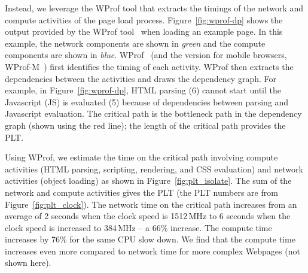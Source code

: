 
 
Instead, we leverage the WProf tool that extracts the timings of the network and compute activities of the page load process. Figure~\ref{fig:wprof-dp} shows the output provided by the WProf tool~\cite{wang2013demystifying,nejati2016depth} when loading an example page. In this example, the network components are shown in {\em green} and the compute components are shown in {\em blue}. WProf~\cite{wang2013demystifying} (and the version for mobile browsers, WProf-M~\cite{nejati2016depth}) first identifies the timing of each activity. WProf then extracts the dependencies between the activities and draws the dependency graph. For example, in Figure~\ref{fig:wprof-dp}, HTML parsing (6) cannot start until the Javascript (JS) is evaluated (5) because of dependencies between parsing and Javascript evaluation.  The critical path is the bottleneck path in the dependency graph (shown using the red line); the length of the critical path provides the PLT. %

Using WProf, we estimate the time on the critical path involving compute activities (HTML parsing, scripting, rendering, and CSS evaluation) and network activities (object loading) as shown in Figure~\ref{fig:plt_isolate}. The sum of the network and compute activities gives the PLT (the PLT numbers are from Figure~\ref{fig:plt_clock}). The network time on the critical path increases from an average of 2 seconds when the clock speed is 1512\,MHz to 6 seconds when the clock speed is increased to 384\,MHz -- a 66\% increase. The compute time increases by 76\% for the same CPU slow down. We find that the compute time increases even more compared to network time for more complex Webpages (not shown here). 

